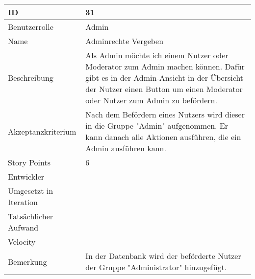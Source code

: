 \begin{tabularx}{\textwidth}{|p{}|X|}
	\hline
	ID & 31 \\
	\hline
	Benutzerrolle & Admin \\
	\hline
	Name & Adminrechte Vergeben\\
	\hline
	Beschreibung & Als Admin möchte ich einem Nutzer oder Moderator zum Admin machen können. Dafür gibt es in der Admin-Ansicht in der Übersicht der Nutzer einen Button um einen Moderator oder Nutzer zum Admin zu befördern.  \\
	\hline
	Akzeptanzkriterium & Nach dem Befördern eines Nutzers wird dieser in die Gruppe "Admin" aufgenommen. Er kann danach alle Aktionen ausführen, die ein Admin ausführen kann. \\
	\hline
	Story Points & 6 \\
	\hline
	Entwickler &  \\
	\hline
	Umgesetzt in Iteration & \\
	\hline
	Tatsächlicher Aufwand & \\
	\hline
	Velocity & \\
	\hline
	Bemerkung & In der Datenbank wird der beförderte Nutzer der Gruppe "Administrator" hinzugefügt. \\
	\hline
\end{tabularx}
\vspace{20pt}
